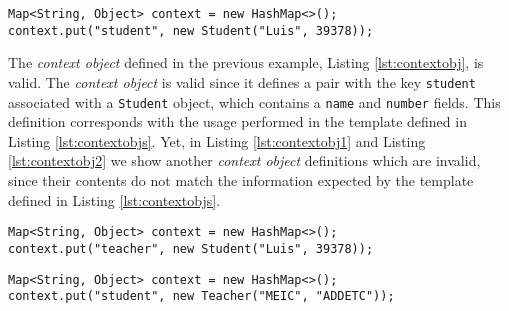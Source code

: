 \bigskip


\begin{minipage}{\linewidth}
\begin{lstlisting}[caption={Template Engine with a Valid Context Object}, label={lst:contextobj}]
Map<String, Object> context = new HashMap<>();
context.put("student", new Student("Luis", 39378));
\end{lstlisting}
\end{minipage} 

\noindent
The \textit{context object} defined in the previous example, Listing \ref{lst:contextobj}, is valid. The \textit{context object} is valid since it defines a pair with the key \texttt{student} associated with a \texttt{Student} object, which contains a \texttt{name} and \texttt{number} fields. This definition corresponds with the usage performed in the template defined in Listing \ref{lst:contextobjs}. Yet, in Listing \ref{lst:contextobj1} and Listing \ref{lst:contextobj2} we show another \textit{context object} definitions which are invalid, since their contents do not match the information expected by the template defined in Listing \ref{lst:contextobjs}.

\bigskip


\begin{minipage}{\linewidth}
\begin{lstlisting}[caption={Template Engine with a Context Object with a Wrong Key}, label={lst:contextobj1}]
Map<String, Object> context = new HashMap<>();
context.put("teacher", new Student("Luis", 39378));
\end{lstlisting}
\end{minipage} 

\bigskip


\begin{minipage}{\linewidth}
\begin{lstlisting}[caption={Template Engine with a Context Object with a Wrong Type}, label={lst:contextobj2}]
Map<String, Object> context = new HashMap<>();
context.put("student", new Teacher("MEIC", "ADDETC"));
\end{lstlisting}
\end{minipage} 

